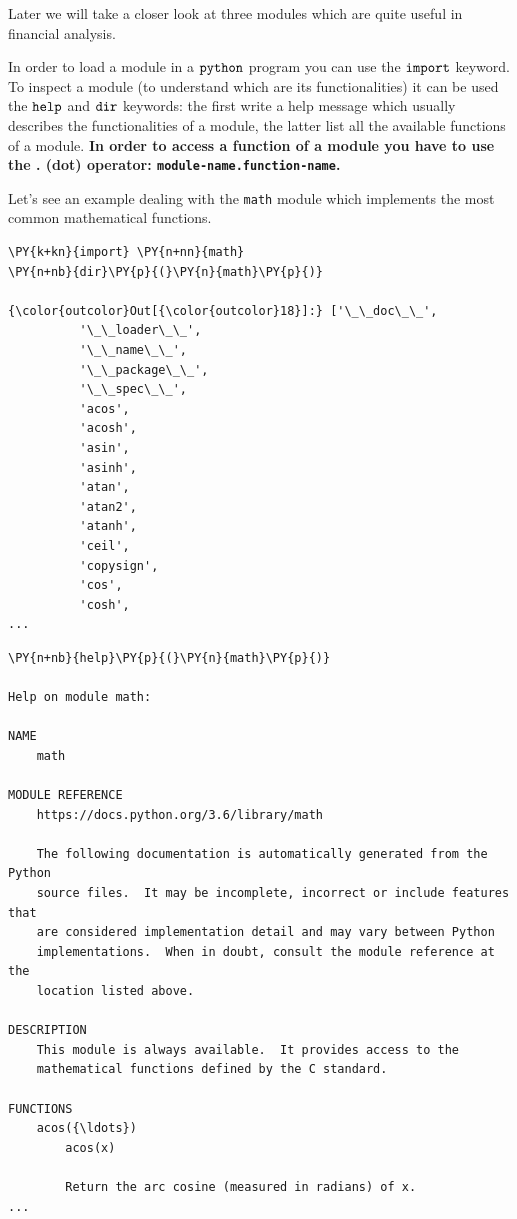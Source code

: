 Later we will take a closer look at three modules which are quite useful in financial analysis.

In order to load a module in a \(\tt{python}\) program you can use the \(\tt{import}\) keyword. To inspect a module (to understand which are its functionalities) it can be used the \(\tt{help}\) and \(\tt{dir}\) keywords: the first write a help message which usually describes the functionalities of a module, the latter list all the available functions of a module.
\textbf{In order to access a function of a module you have to use the . (dot) operator: \texttt{module-name.function-name}.}

Let's see an example dealing with the \texttt{math} module which implements the most common mathematical functions.

\begin{tcolorbox}[breakable, size=fbox, boxrule=1pt, pad at break*=1mm, colback=cellbackground, colframe=cellborder]            
\begin{Verbatim}[commandchars=\\\{\}]
\PY{k+kn}{import} \PY{n+nn}{math}
\PY{n+nb}{dir}\PY{p}{(}\PY{n}{math}\PY{p}{)}

{\color{outcolor}Out[{\color{outcolor}18}]:} ['\_\_doc\_\_',
          '\_\_loader\_\_',
          '\_\_name\_\_',
          '\_\_package\_\_',
          '\_\_spec\_\_',
          'acos',
          'acosh',
          'asin',
          'asinh',
          'atan',
          'atan2',
          'atanh',
          'ceil',
          'copysign',
          'cos',
          'cosh',
...
\end{Verbatim}
\end{tcolorbox}

\begin{tcolorbox}[breakable, size=fbox, boxrule=1pt, pad at break*=1mm, colback=cellbackground, colframe=cellborder]            
\begin{Verbatim}[commandchars=\\\{\}]
\PY{n+nb}{help}\PY{p}{(}\PY{n}{math}\PY{p}{)}

Help on module math:

NAME
    math

MODULE REFERENCE
    https://docs.python.org/3.6/library/math

    The following documentation is automatically generated from the Python
    source files.  It may be incomplete, incorrect or include features that
    are considered implementation detail and may vary between Python
    implementations.  When in doubt, consult the module reference at the
    location listed above.

DESCRIPTION
    This module is always available.  It provides access to the
    mathematical functions defined by the C standard.

FUNCTIONS
    acos({\ldots})
        acos(x)

        Return the arc cosine (measured in radians) of x.
...
\end{Verbatim}
\end{tcolorbox}

